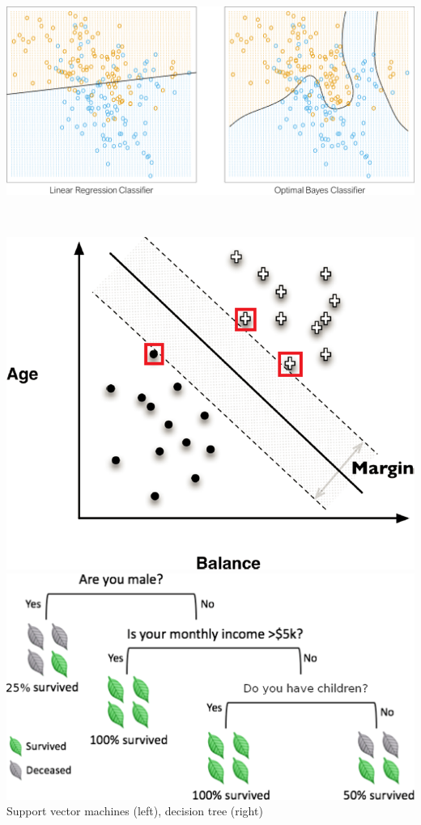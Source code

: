 \documentclass[20pt,landscape,footrule,headrule]{foils}
\begin{document}
\newpage\ \\ \begin{center}
\includegraphics[width=\textwidth]{Images/RegBayes} 
\end{center}
\newpage\ \\ \begin{center}
\includegraphics[height=0.5\textheight]{Images/SVM} \qquad \includegraphics[height=0.5\textheight]{Images/DecisionTree} \newline Support vector machines (left), decision tree (right) 
\end{center}
\end{document}

